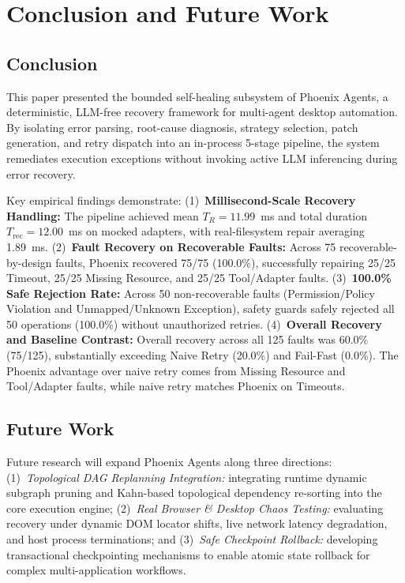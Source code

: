 \documentclass[conference]{IEEEtran}
\newcommand{\chg}[1]{{\color{blue}#1}}
\begin{document}
\section{Conclusion and Future Work}

\subsection{Conclusion}
This paper presented the bounded self-healing subsystem of Phoenix Agents, a deterministic, LLM-free recovery framework for multi-agent desktop automation. By isolating error parsing, root-cause diagnosis, strategy selection, patch generation, and retry dispatch into an in-process 5-stage pipeline, the system remediates execution exceptions without invoking active LLM inferencing during error recovery.

Key empirical findings demonstrate:
\chg{(1)~\textbf{Millisecond-Scale Recovery Handling:} The pipeline achieved mean $T_R = 11.99$~ms and total duration $T_{\text{rec}} = 12.00$~ms on mocked adapters, with real-filesystem repair averaging 1.89~ms.}
\chg{(2)~\textbf{Fault Recovery on Recoverable Faults:} Across 75 recoverable-by-design faults, Phoenix recovered 75/75 (100.0\%), successfully repairing 25/25 Timeout, 25/25 Missing Resource, and 25/25 Tool/Adapter faults.}
(3)~\textbf{100.0\% Safe Rejection Rate:} Across 50 non-recoverable faults (Permission/Policy Violation and Unmapped/Unknown Exception), safety guards safely rejected all 50 operations (100.0\%) without unauthorized retries.
\chg{(4)~\textbf{Overall Recovery and Baseline Contrast:} Overall recovery across all 125 faults was 60.0\% (75/125), substantially exceeding Naive Retry (20.0\%) and Fail-Fast (0.0\%). The Phoenix advantage over naive retry comes from Missing Resource and Tool/Adapter faults, while naive retry matches Phoenix on Timeouts.}

\subsection{Future Work}
Future research will expand Phoenix Agents along three directions: (1)~\textit{Topological DAG Replanning Integration:} integrating runtime dynamic subgraph pruning and Kahn-based topological dependency re-sorting into the core execution engine; (2)~\textit{Real Browser \& Desktop Chaos Testing:} evaluating recovery under dynamic DOM locator shifts, live network latency degradation, and host process terminations; and (3)~\textit{Safe Checkpoint Rollback:} developing transactional checkpointing mechanisms to enable atomic state rollback for complex multi-application workflows.
\end{document}
